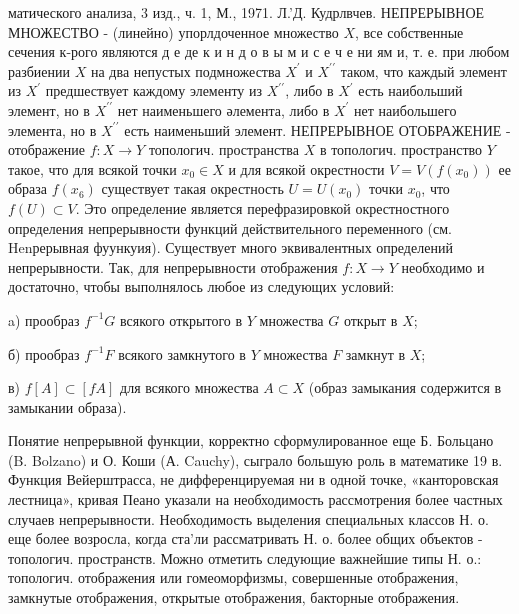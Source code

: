 \documentclass[10pt]{article}
\begin{document}
матического анализа, 3 изд., ч. 1, М., 1971. Л.'Д. Кудрлвчев. НЕПРЕРЫВНОЕ МНОЖЕСТВО - (линейно) упорлдоченное множество $X$, все собственные сечения к-рого являются д е де к и н д о в ы м и с е ч е ни ям и, т. е. при любом разбиении $X$ на два непустых подмножества $X^{\prime}$ и $X^{\prime \prime}$ таком, что каждый элемент из $X^{\prime}$ предшествует каждому элементу из $X^{\prime \prime}$, либо в $X^{\prime}$ есть наибольший элемент, но в $X^{\prime \prime}$ нет наименьшего әлемента, либо в $X^{\prime}$ нет наибольшего элемента, но в $X^{\prime \prime}$ есть наименьший элемент. НЕПРЕРЫВНОЕ ОТОБРАЖЕНИЕ - отображение $f: X \rightarrow Y$ топологич. пространства $X$ в топологич. пространство $Y$ такое, что для всякой точки $x_{0} \in X$ и для всякой окрестности $V=V\left(f\left(x_{0}\right)\right)$ ее образа $f\left(x_{6}\right)$ существует такая окрестность $U=U\left(x_{0}\right)$ точки $x_{0}$, что $f(U) \subset V$. Это определение является перефразировкой окрестностного определения непрерывности функций действительного переменного (см. Henрерывная фуункуия). Существует много эквивалентных определений непрерывности. Так, для непрерывности отображения $f: X \rightarrow Y$ необходимо и достаточно, чтобы выполнялось любое из следующих условий:



a) прообраз $f^{-1} G$ всякого открытого в $Y$ множества $G$ открыт в $X$;



б) прообраз $f^{-1} F$ всякого замкнутого в $Y$ множества $F$ замкнут в $X$;



в) $f[A] \subset[f A]$ для всякого множества $A \subset X$ (образ замыкания содержится в замыкании образа).



Понятие непрерывной функции, корректно сформулированное еще Б. Больцано (B. Bolzano) и О. Коши (А. Cauchy), сыграло большую роль в математике 19 в. Функция Вейерштрасса, не дифференцируемая ни в одной точке, «канторовская лестница», кривая Пеано указали на необходимость рассмотрения более частных случаев непрерывности. Необходимость выделения специальных классов Н. о. еще более возросла, когда ста'ли рассматривать Н. о. более общих объектов - топологич. пространств. Можно отметить следующие важнейшие типы Н. о.: топологич. отображения или гомеоморфизмы, совершенные отображения, замкнутые отображения, открытые отображения, бакторные отображения.
\end{document}
